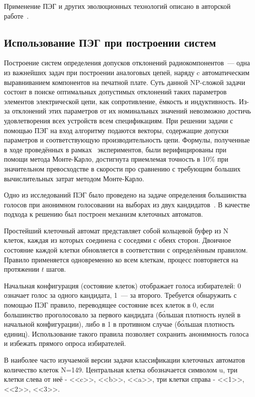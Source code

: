 Применение ПЭГ и других эволюционных технологий описано в авторской работе~\cite{SergMir_06_2013_imagecompress_all}.


\subsection{Использование ПЭГ при построении систем}

Построение систем определения допусков отклонений радиокомпонентов~--- одна из важнейших задач при построении аналоговых цепей, наряду c автоматическим выравниванием компонентов на печатной плате. Суть данной NP-сложой задачи состоит в поиске оптимальных допустимых отклонений таких параметров элементов электрической цепи, как сопротивление, ёмкость и индуктивность. Из-за отклонений этих параметров от их номинальных значений невозможно достичь удовлетворения всех устройств всем спецификациям. При решении задачи с помощью ПЭГ на вход алгоритму подаются векторы, содержащие допуски параметров и соответствующую производительность цепи. Формулы, полученные в ходе проведённых в рамках~\cite{DT_ICSES} экспериментов, были верифицированы при помощи метода Монте-Карло, достигнута приемлемая точность в 10\% при значительном превосходстве в скорости про сравнению с требующим больших вычислительных затрат методом Монте-Карло.

Одно из исследований ПЭГ было проведено на задаче определения большинства голосов при анонимном голосовании на выборах из двух кандидатов~\cite{conf/eurogp/Ferreira02}. В качестве подхода к решению был построен механизм клеточных автоматов.

Простейший клеточный автомат представляет собой кольцевой буфер из N клеток, каждая из которых соединена с соседями с обеих сторон. Двоичное состояние каждой клетки обновляется в соответствии с определённым правилом. Правило применяется одновременно ко всем клеткам, процесс повторяется на протяжении $t$ шагов.

Начальная конфигурация (состояние клеток) отображает голоса избирателей: 0 означает голос за одного кандидата, 1~--- за второго. Требуется обнаружить с помощью ПЭГ правило, переводящее состояние всех клеток в 0, если большинство проголосовало за первого кандидата (б\'{о}льшая плотность нулей в начальной конфигурации), либо в 1 в противном случае (б\'{о}льшая плотность единиц). Использование такого правила позволяет сохранить анонимность голоса и избежать прямого опроса избирателей.

В наиболее часто изучаемой версии задачи классификации клеточных автоматов количество клеток N=149. Центральная клетка обозначается символом u, три клетки слева от неё - <<c>>, <<b>>, <<a>>, три клетки справа - <<1>>, <<2>>, <<3>>.

